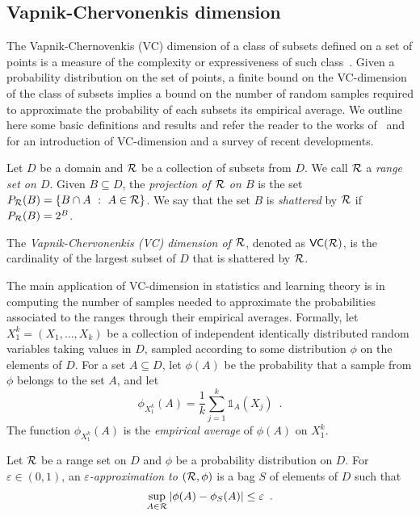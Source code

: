 \subsection{Vapnik-Chervonenkis dimension}\label{sec:prelvcdim}
The Vapnik-Chernovenkis (VC) dimension of a class of subsets defined
on a set of points is a measure of the complexity or expressiveness of such
class~\citep{VapnikC71}. Given a probability distribution on the set of points,
a finite bound on the VC-dimension of the class of subsets implies a bound on
the number of random samples required to approximate the probability of each
subsets its empirical average. We outline here some basic definitions and
results and refer the reader to the works of~\citet[Sect.~14.4]{AlonS08} and
\citet[Sect.~3]{BoucheronBL05} for an introduction of VC-dimension and a survey
of recent developments. 

Let $D$ be a domain and $\mathcal{R}$ be a collection of subsets from $D$. We call
$\mathcal{R}$ a \emph{range set on $D$}.
Given $B\subseteq D$, the \emph{projection of $\mathcal{R}$ on $B$} is the set 
$P_{\mathcal{R}}(B)=\{ B\cap A ~:~ A\in\mathcal{R}\}$. We say that the set $B$ is
\emph{shattered} by $\mathcal{R}$ if $P_{\mathcal{R}}(B)=2^B$.

\begin{definition}\label{def:vcdim}
  The \emph{Vapnik-Chervonenkis (VC) dimension of $\mathcal{R}$}, denoted as
  $\mathsf{VC}(\mathcal{R})$, is the cardinality of the largest subset of $D$ that is
  shattered by $\mathcal{R}$.
\end{definition}

The main application of VC-dimension in statistics and learning
theory is in computing the number of samples needed to approximate the
probabilities associated to the ranges through their empirical averages.
Formally, let $X_1^k=(X_1,\dotsc,X_k)$ be a collection of independent
identically distributed random variables taking values in $D$, sampled 
according to some distribution $\phi$ on the elements of $D$.
For a set $A\subseteq D$, let $\phi(A)$ be the probability that a sample from
$\phi$ belongs to the set $A$, and let
\[
\phi_{X_1^k}(A)=\frac{1}{k}\sum_{j=1}^k\mathds{1}_A(X_j)\enspace.%
\]
The function
$\phi_{X_1^k}(A)$ is the \emph{empirical average} of $\phi(A)$ on $X_1^k$.

\begin{definition}\label{def:eapprox}
  Let $\mathcal{R}$ be a range set on %
  $D$ and $\phi$ be a probability distribution on $D$. For $\varepsilon\in(0,1)$,
  an \emph{$\varepsilon$-approximation to $(\mathcal{R},\phi)$} is a bag $S$ of
  elements of $D$ such that 
  \[
  \sup_{A\in\mathcal{R}}|\phi(A)-\phi_S(A)|\le\varepsilon\enspace.\]
\end{definition}

